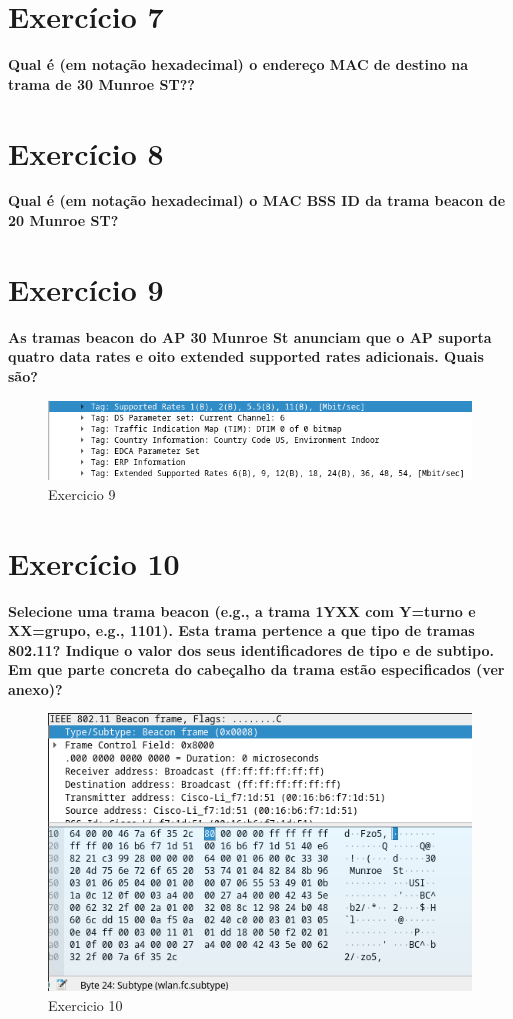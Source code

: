 \documentclass[a4paper]{report}
\begin{document}
\section{Exercício 7}
\textbf{Qual é (em notação hexadecimal) o endereço MAC de destino na trama de 30
    Munroe ST??}

\section{Exercício 8}
\textbf{Qual é (em notação hexadecimal) o MAC BSS ID da trama beacon de 20
    Munroe ST?}

\section{Exercício 9}
\textbf{As tramas beacon do AP 30 Munroe St anunciam que o AP suporta quatro
    data rates e oito extended supported rates adicionais. Quais são?}
\begin{figure}[H]
    \centering 
    \includegraphics[width=\textwidth]{images/ex9.png}  
    \caption{Exercicio 9}
    \label{fig:ex9}
\end{figure}

\section{Exercício 10}
\textbf{Selecione uma trama beacon (e.g., a trama 1YXX com Y=turno e XX=grupo,
    e.g., 1101). Esta trama pertence a que tipo de tramas 802.11? Indique o
    valor dos seus identificadores de tipo e de subtipo. Em que parte concreta
    do cabeçalho da trama estão especificados (ver anexo)?}

\begin{figure}[H]
    \centering 
    \includegraphics[width=\textwidth]{images/ex10.png}  
    \caption{Exercicio 10}
    \label{fig:ex10}
\end{figure}
\end{document}
